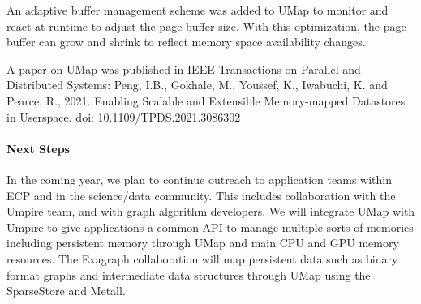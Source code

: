 An adaptive buffer management scheme was added to UMap to monitor and
react at runtime to adjust the page buffer size. With this
optimization, the page buffer can grow and shrink to reflect memory
space availability changes.

A paper on UMap was published in IEEE Transactions on Parallel and
Distributed Systems:  Peng, I.B., Gokhale, M., Youssef, K., Iwabuchi, K. and Pearce, R., 2021. Enabling Scalable and Extensible Memory-mapped Datastores in Userspace. doi: 10.1109/TPDS.2021.3086302

\paragraph{Next Steps}
In the coming year, we plan to continue outreach to application teams
within ECP and in the science/data community. This includes
collaboration with the Umpire team, and with graph algorithm
developers. We will integrate UMap with Umpire to give applications a
common API to manage multiple sorts of memories including persistent
memory through UMap and main CPU and GPU memory resources. The
Exagraph collaboration will map persistent data such as binary format
graphs and intermediate data structures through UMap using the
SparseStore and Metall.

